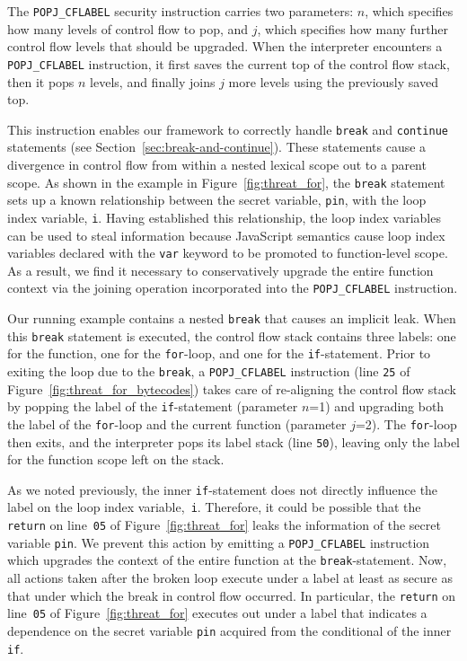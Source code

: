 \documentclass[preprint]{sigplanconf}
\begin{document}
The \texttt{POPJ\_CFLABEL} security instruction carries two parameters: $n$, which specifies how many levels of control flow to pop, and $j$, which specifies how many further control flow levels that should be upgraded.
When the interpreter encounters a \texttt{POPJ\_CFLABEL} instruction, it first saves the current top of the control flow stack, then it pops $n$ levels, and finally joins $j$ more levels using the previously saved top.

This instruction enables our framework to correctly handle \texttt{break} and \texttt{continue} statements (see Section~\ref{sec:break-and-continue}).
These statements cause a divergence in control flow from within a nested lexical scope out to a parent scope.
As shown in the example in Figure~\ref{fig:threat_for}, the \texttt{break} statement sets up a known relationship between the secret variable, \texttt{pin}, with the loop index variable, \texttt{i}.
Having established this relationship, the loop index variables can be used to steal information because JavaScript semantics cause loop index variables declared with the \texttt{var} keyword to be promoted to function-level scope.
As a result, we find it necessary to conservatively upgrade the entire function context via the joining operation incorporated into the \texttt{POPJ\_CFLABEL} instruction.

Our running example contains a nested \texttt{break} that causes an implicit leak.
When this \texttt{break} statement is executed, the control flow stack contains three labels: one for the function, one for the \texttt{for}-loop, and one for the \texttt{if}-statement.
Prior to exiting the loop due to the \texttt{break}, a \texttt{POPJ\_CFLABEL} instruction (line \texttt{25} of Figure~\ref{fig:threat_for_bytecodes}) takes care of re-aligning the control flow stack by popping the label of the \texttt{if}-statement (parameter $n$=1) and upgrading both the label of the \texttt{for}-loop and the current function (parameter $j$=2).
The \texttt{for}-loop then exits, and the interpreter pops its label stack (line \texttt{50}), leaving only the label for the function scope left on the stack.

As we noted previously, the inner \texttt{if}-statement does not directly influence the label on the loop index variable,~\texttt{i}.
Therefore, it could be possible that the \texttt{return} on line~\texttt{05} of Figure~\ref{fig:threat_for} leaks the information of the secret variable \texttt{pin}.
We prevent this action by emitting a \texttt{POPJ\_CFLABEL} instruction which upgrades the context of the entire function at the \texttt{break}-statement.
Now, all actions taken after the broken loop execute under a label at least as secure as that under which the break in control flow occurred.
In particular, the \texttt{return} on line~\texttt{05} of Figure~\ref{fig:threat_for} executes out under a label that indicates a dependence on the secret variable \texttt{pin} acquired from the conditional of the inner \texttt{if}.
\end{document}
